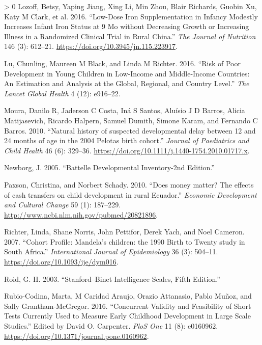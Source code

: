 \documentclass[
]{book}
\newlength{\cslhangindent}
\newenvironment{CSLReferences}[3] %
 {%
  \setlength{\parindent}{0pt}
  \ifodd #1 \everypar{\setlength{\hangindent}{\cslhangindent}}\ignorespaces\fi
  \ifnum #2 > 0
  \setlength{\parskip}{#2\baselineskip}
  \fi
 }%
 {}
\begin{document}
\begin{CSLReferences}{1}{0}
\leavevmode\hypertarget{ref-Lozoff2016}{}%
Lozoff, Betsy, Yaping Jiang, Xing Li, Min Zhou, Blair Richards, Guobin Xu, Katy M Clark, et al. 2016. {``{Low-Dose Iron Supplementation in Infancy Modestly Increases Infant Iron Status at 9 Mo without Decreasing Growth or Increasing Illness in a Randomized Clinical Trial in Rural China.}''} \emph{The Journal of Nutrition} 146 (3): 612--21. \url{https://doi.org/10.3945/jn.115.223917}.

\leavevmode\hypertarget{ref-lu2016}{}%
Lu, Chunling, Maureen M Black, and Linda M Richter. 2016. {``Risk of Poor Development in Young Children in Low-Income and Middle-Income Countries: An Estimation and Analysis at the Global, Regional, and Country Level.''} \emph{The Lancet Global Health} 4 (12): e916--22.

\leavevmode\hypertarget{ref-Moura2010}{}%
Moura, Danilo R, Jaderson C Costa, Iná S Santos, Aluísio J D Barros, Alicia Matijasevich, Ricardo Halpern, Samuel Dumith, Simone Karam, and Fernando C Barros. 2010. {``{Natural history of suspected developmental delay between 12 and 24 months of age in the 2004 Pelotas birth cohort.}''} \emph{Journal of Paediatrics and Child Health} 46 (6): 329--36. \url{https://doi.org/10.1111/j.1440-1754.2010.01717.x}.

\leavevmode\hypertarget{ref-newborg2005}{}%
Newborg, J. 2005. {``Battelle Developmental Inventory-2nd Edition.''}

\leavevmode\hypertarget{ref-Paxson2010}{}%
Paxson, Christina, and Norbert Schady. 2010. {``{Does money matter? The effects of cash transfers on child development in rural Ecuador.}''} \emph{Economic Development and Cultural Change} 59 (1): 187--229. \url{http://www.ncbi.nlm.nih.gov/pubmed/20821896}.

\leavevmode\hypertarget{ref-Richter2007}{}%
Richter, Linda, Shane Norris, John Pettifor, Derek Yach, and Noel Cameron. 2007. {``{Cohort Profile: Mandela's children: the 1990 Birth to Twenty study in South Africa.}''} \emph{International Journal of Epidemiology} 36 (3): 504--11. \url{https://doi.org/10.1093/ije/dym016}.

\leavevmode\hypertarget{ref-roid2003}{}%
Roid, G. H. 2003. {``Stanford--Binet Intelligence Scales, Fifth Edition.''}

\leavevmode\hypertarget{ref-Rubio-Codina2016}{}%
Rubio-Codina, Marta, M Caridad Araujo, Orazio Attanasio, Pablo Muñoz, and Sally Grantham-McGregor. 2016. {``{Concurrent Validity and Feasibility of Short Tests Currently Used to Measure Early Childhood Development in Large Scale Studies.}''} Edited by David O. Carpenter. \emph{PloS One} 11 (8): e0160962. \url{https://doi.org/10.1371/journal.pone.0160962}.


\end{CSLReferences}
\end{document}
